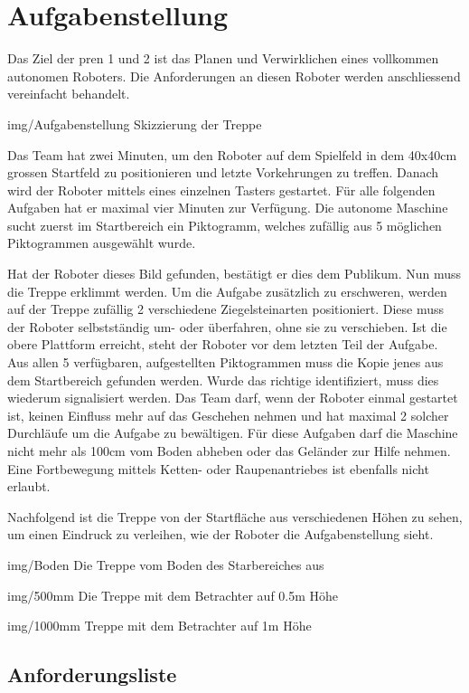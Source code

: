 \section{Aufgabenstellung}

Das Ziel der \acrfull{pren} 1 und 2 ist das Planen und Verwirklichen eines vollkommen autonomen Roboters. Die Anforderungen an diesen Roboter werden anschliessend vereinfacht behandelt. 

\image
 {img/Aufgabenstellung}
 {Skizzierung der Treppe}
 
Das Team hat zwei Minuten, um den Roboter auf dem Spielfeld in dem 40x40cm grossen 
Startfeld zu positionieren und letzte Vorkehrungen zu treffen. 
Danach wird der Roboter mittels eines einzelnen Tasters gestartet. 
Für alle folgenden Aufgaben hat er maximal vier Minuten zur Verfügung. 
Die autonome Maschine sucht zuerst im Startbereich ein Piktogramm, welches zufällig aus 5 möglichen Piktogrammen ausgewählt wurde. 

Hat der Roboter dieses Bild gefunden, bestätigt er dies dem Publikum. 
Nun muss die Treppe erklimmt werden. Um die Aufgabe zusätzlich zu erschweren,
werden auf der Treppe zufällig 2 verschiedene Ziegelsteinarten positioniert. 
Diese muss der Roboter selbstständig um- oder überfahren, ohne sie zu verschieben.
Ist die obere Plattform erreicht, steht der Roboter vor dem letzten Teil der Aufgabe. 
Aus allen 5 verfügbaren, aufgestellten Piktogrammen muss die Kopie jenes aus dem 
Startbereich gefunden werden. Wurde das richtige identifiziert, 
muss dies wiederum signalisiert werden. Das Team darf,
wenn der Roboter einmal gestartet ist, 
keinen Einfluss mehr auf das Geschehen nehmen und hat maximal 2 solcher Durchläufe 
um die Aufgabe zu bewältigen. Für diese Aufgaben darf die Maschine nicht mehr 
als 100cm vom Boden abheben oder das Geländer zur Hilfe nehmen. 
Eine Fortbewegung mittels Ketten- oder Raupenantriebes ist ebenfalls nicht erlaubt.

Nachfolgend ist die Treppe von der Startfläche aus verschiedenen Höhen zu sehen, um einen Eindruck zu verleihen, wie der Roboter die Aufgabenstellung sieht.

\image
  {img/Boden}
  {Die Treppe vom Boden des Starbereiches aus}
 
\image
 {img/500mm}
 {Die Treppe mit dem Betrachter auf 0.5m Höhe}
 
\image
 {img/1000mm}
 {Treppe mit dem Betrachter auf 1m Höhe}

\subsection{Anforderungsliste}
\label{sec:anforderungsliste}

